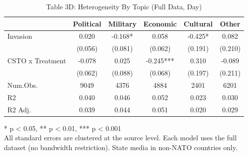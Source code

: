 \begin{table}[!t]
\caption{Table 3D: Heterogeneity By Topic (Full Data, Day)} 
\fontsize{12.0pt}{14.4pt}\selectfont
\begin{tabular*}{\linewidth}{@{\extracolsep{\fill}}lccccc}
\toprule
  & Political & Military & Economic & Cultural & Other \\ 
\midrule\addlinespace[2.5pt]
Invasion & 0.020 & -0.168* & 0.058 & -0.425* & 0.082 \\ 
 & (0.056) & (0.081) & (0.062) & (0.191) & (0.210) \\ 
CSTO x Treatment & -0.078 & 0.025 & -0.245*** & 0.310 & -0.089 \\ 
{} & {(0.062)} & {(0.088)} & {(0.068)} & {(0.197)} & {(0.211)} \\ 
Num.Obs. & 9049 & 4376 & 4884 & 2401 & 6201 \\ 
R2 & 0.040 & 0.046 & 0.052 & 0.023 & 0.030 \\ 
R2 Adj. & 0.039 & 0.044 & 0.051 & 0.020 & 0.029 \\ 
\bottomrule
\end{tabular*}
\begin{minipage}{\linewidth}
* p < 0.05, ** p < 0.01, *** p < 0.001\\
All standard errors are clustered at the source level. Each model uses the full
dataset (no bandwidth restriction). State media in non-NATO countries only.\\
\end{minipage}
\end{table}


